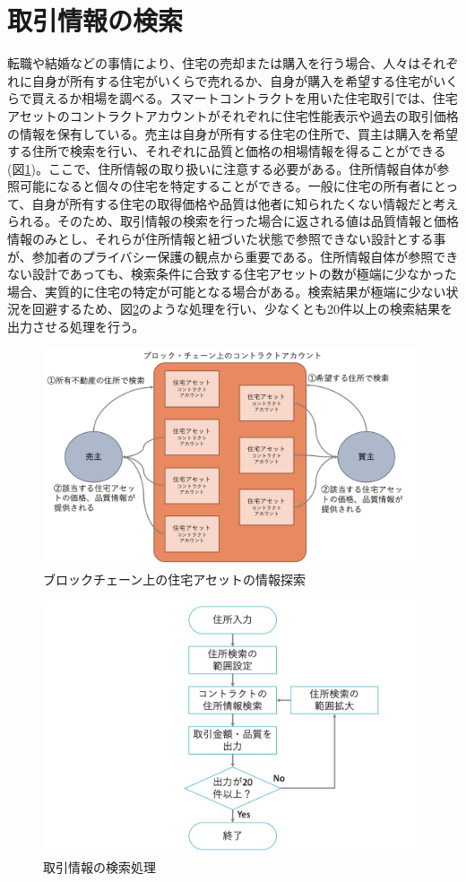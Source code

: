 \documentclass[a4paper,fontsize=11pt,report,notitlepage,line_length=38zw,number_of_lines=40,dvipdfmx]{jlreq}
\begin{document}
\section{取引情報の検索}
転職や結婚などの事情により、住宅の売却または購入を行う場合、人々はそれぞれに自身が所有する住宅がいくらで売れるか、自身が購入を希望する住宅がいくらで買えるか相場を調べる。スマートコントラクトを用いた住宅取引では、住宅アセットのコントラクトアカウントがそれぞれに住宅性能表示や過去の取引価格の情報を保有している。売主は自身が所有する住宅の住所で、買主は購入を希望する住所で検索を行い、それぞれに品質と価格の相場情報を得ることができる(図\ref{search})。ここで、住所情報の取り扱いに注意する必要がある。住所情報自体が参照可能になると個々の住宅を特定することができる。一般に住宅の所有者にとって、自身が所有する住宅の取得価格や品質は他者に知られたくない情報だと考えられる。そのため、取引情報の検索を行った場合に返される値は品質情報と価格情報のみとし、それらが住所情報と紐づいた状態で参照できない設計とする事が、参加者のプライバシー保護の観点から重要である。住所情報自体が参照できない設計であっても、検索条件に合致する住宅アセットの数が極端に少なかった場合、実質的に住宅の特定が可能となる場合がある。検索結果が極端に少ない状況を回避するため、図\ref{flow}のような処理を行い、少なくとも20件以上の検索結果を出力させる処理を行う。

\begin{figure}
 \centering
 \includegraphics[width=11cm]{search.png}
 \caption{ブロックチェーン上の住宅アセットの情報探索}
 \label{search}
\end{figure}

\begin{figure}
 \centering
 \includegraphics[width=12cm]{searchflow.png}
 \caption{取引情報の検索処理}
 \label{flow}
\end{figure}
\end{document}
